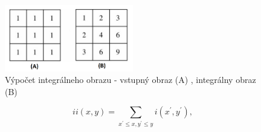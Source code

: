 \documentclass[slovak,master,dept460,male,cpp,cpdeclaration]{diploma}
\begin{document}
\begin{figure}[H]
	\centering
	\includegraphics[width=0.5\textwidth]{Figures/integralImage.png}
	\caption{Výpočet integrálneho obrazu - vstupný obraz (A) , integrálny obraz (B)}
	\label{fig:integralImage}
\end{figure}


\begin{equation}
ii(x,y)=\sum_{x^{\prime}\leq x,y^{\prime}\leq y}i(x^{\prime},y^{\prime}),
\label{eq:integral}
\end{equation}
\end{document}
